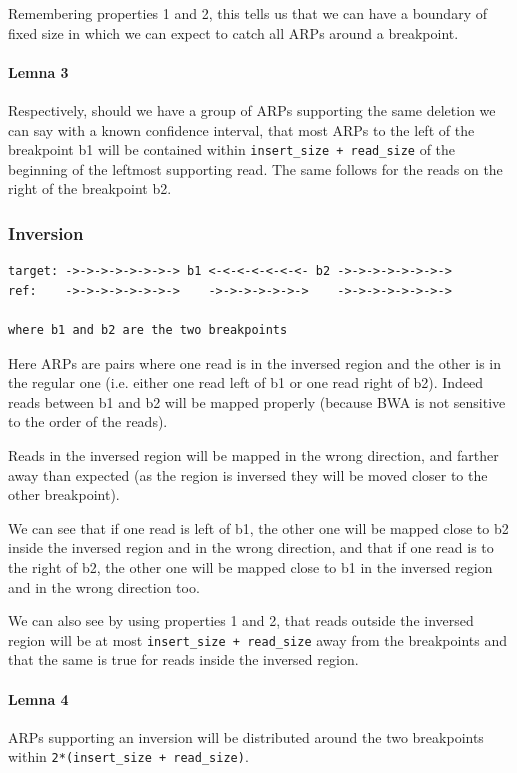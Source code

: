 \documentclass{article}
\begin{document}
Remembering properties 1 and 2, this tells us that we can have a boundary of fixed size in which
we can expect to catch all ARPs around a breakpoint.

\paragraph{Lemna 3} Respectively, should we have a group of ARPs supporting the same deletion we can say with a known confidence interval, that most ARPs to the left of the breakpoint b1 will be contained within \verb|insert_size + read_size| of the beginning of the leftmost supporting read. The same follows for the reads on the right of the breakpoint b2.

\subsubsection{Inversion} 

\begin{verbatim}
target: ->->->->->->->-> b1 <-<-<-<-<-<-<- b2 ->->->->->->->->
ref:    ->->->->->->->->    ->->->->->->->    ->->->->->->->->

where b1 and b2 are the two breakpoints
\end{verbatim}

Here ARPs are pairs where one read is in the inversed region and the other
is in the regular one (i.e. either one read left of b1 or one read right of b2). Indeed reads
between b1 and b2 will be mapped properly (because BWA is not sensitive to the order of the reads).

Reads in the inversed region will be mapped in the wrong direction, and farther away
than expected (as the region is inversed they will be moved closer to the other breakpoint).

We can see that if one read is left of b1, the other one will be mapped close to
b2 inside the inversed region and in the wrong direction, and that if one read is to the right
of b2, the other one will be mapped close to b1 in the inversed region and in the wrong direction
too.

We can also see by using properties 1 and 2, that reads outside the inversed region will be at most
\verb|insert_size + read_size| away from the breakpoints and that the same is true for reads inside
the inversed region.

\paragraph{Lemna 4} ARPs supporting an inversion will be distributed around the two
breakpoints within \verb|2*(insert_size + read_size)|.
\end{document}
